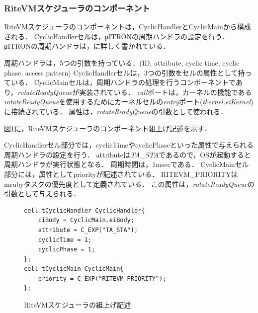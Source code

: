 \documentclass[submit,techrep]{ipsj}
\begin{document}
\subsubsection{RiteVMスケジューラのコンポーネント}
RiteVMスケジューラのコンポーネントは，CyclicHandlerとCyclicMainから構成される．
CyclicHandlerセルは，μITRONの周期ハンドラの設定を行う．
μITRONの周期ハンドラは，\cite{par:microITRON}に詳しく書かれている．

周期ハンドラは，5つの引数を持っている．(ID, attribute, cyclic time, cyclic phase, access pattern)
CyclicHandlerセルは，3つの引数をセルの属性として持っている．
CyclicMainセルは，周期ハンドラの処理を行うコンポーネントであり，{\it rotateReadyQueue}が実装されている．
{\it call}ポートは，カーネルの機能である{\it rotateReadyQueue}を使用するためにカーネルセルの{\it entry}ポート({\it tkernel.eiKernel})に接続されている．
属性は，{\it rotateReadyQueue}の引数として使われる．

図\ref{build_cyclic_handler}に，RiteVMスケジューラのコンポーネント組上げ記述を示す．

CyclicHandlerセル部分では，cyclicTimeやcyclicPhaseといった属性で与えられる周期ハンドラの設定を行う．
attributeは{\it TA\_STA}であるので，OSが起動すると周期ハンドラが実行状態となる．
周期時間は，1msecである．
CyclicMainセル部分には，属性としてpriorityが記述されている．
RITEVM\_PRIORITYはmrubyタスクの優先度として定義されている．
この属性は，{\it rotateReadyQueue}の引数として与えられる．

\begin{figure}[t]
    \centering
    \begin{lstlisting}
cell tCyclicHandler CyclicHandler{
    ciBody = CyclicMain.eiBody;
    attribute = C_EXP("TA_STA");
    cyclicTime = 1;
    cyclicPhase = 1;
};
cell tCyclicMain CyclicMain{
    priority = C_EXP("RITEVM_PRIORITY");
};
   \end{lstlisting}
    \caption{RiteVMスケジューラの組上げ記述}
    \label{build_cyclic_handler}
\end{figure}
 
\end{document}
